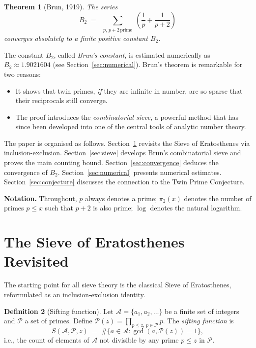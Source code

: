 \documentclass[12pt,a4paper]{amsart}
\newtheorem{theorem}{Theorem}[section]
\theoremstyle{definition}
\newtheorem{definition}[theorem]{Definition}
\begin{document}
\begin{theorem}[Brun, 1919]\label{thm:brun_main}
The series
\[
  B_2 \;=\; \sum_{\substack{p,\,p+2\,\text{prime}}} \left(\frac{1}{p}+\frac{1}{p+2}\right)
\]
converges absolutely to a finite positive constant $B_2$.
\end{theorem}

The constant $B_2$, called \emph{Brun's constant}, is estimated numerically as
$B_2 \approx 1.9021604$ (see Section~\ref{sec:numerical}).  Brun's theorem is
remarkable for two reasons:
\begin{itemize}
  \item It shows that twin primes, \emph{if} they are infinite in number, are
    so sparse that their reciprocals still converge.
  \item The proof introduces the \emph{combinatorial sieve}, a powerful
    method that has since been developed into one of the central tools
    of analytic number theory.
\end{itemize}

The paper is organised as follows.  Section~\ref{sec:eratosthenes} revisits
the Sieve of Eratosthenes via inclusion-exclusion.  Section~\ref{sec:sieve}
develops Brun's combinatorial sieve and proves the main counting bound.
Section~\ref{sec:convergence} deduces the convergence of $B_2$.
Section~\ref{sec:numerical} presents numerical estimates.
Section~\ref{sec:conjecture} discusses the connection to the Twin Prime
Conjecture.

\textbf{Notation.}
Throughout, $p$ always denotes a prime; $\pi_2(x)$ denotes the number
of primes $p \leq x$ such that $p+2$ is also prime;
$\log$ denotes the natural logarithm.

\section{The Sieve of Eratosthenes Revisited}
\label{sec:eratosthenes}

The starting point for all sieve theory is the classical Sieve of
Eratosthenes, reformulated as an inclusion-exclusion identity.

\begin{definition}[Sifting function]
  Let $\mathcal{A} = \{a_1, a_2, \ldots\}$ be a finite set of integers and
  $\mathcal{P}$ a set of primes.  Define $\mathcal{P}(z) = \prod_{p \leq z,\, p \in \mathcal{P}} p$.
  The \emph{sifting function} is
  \[
    S(\mathcal{A}, \mathcal{P}, z)
    \;=\; \#\{a \in \mathcal{A} : \gcd(a, \mathcal{P}(z)) = 1\},
  \]
  i.e., the count of elements of $\mathcal{A}$ not divisible by any prime
  $p \leq z$ in $\mathcal{P}$.
\end{definition}
\end{document}
